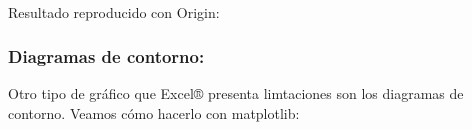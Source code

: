 \documentclass{article}
\begin{document}
    \begin{center}
    \end{center}
    { \hspace*{\fill} \\}
    
    Resultado reproducido con Origin:


    \subsubsection{Diagramas de contorno:}


    Otro tipo de gráfico que Excel® presenta limtaciones son los diagramas
de contorno. Veamos cómo hacerlo con matplotlib:
\end{document}
